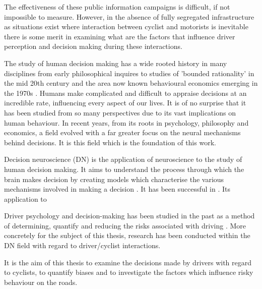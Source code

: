 The effectiveness of these public information campaigns is difficult, if not impossible to measure. However, in the absence of fully segregated infrastructure as situations exist where interaction between cyclist and motorists is inevitable there is some merit in examining what are the factors that influence driver perception and decision making during these interactions.

The study of human decision making has a wide rooted history in many disciplines from early philosophical inquires to studies of 'bounded rationality' in the mid 20th century and the area now known behavioural economics emerging in the 1970s \citep{jonesBOUNDEDRATIONALITY1999,kaoBehaviouralEconomicsClassical2015}. Humans make complicated and difficult to appraise decisions at an incredible rate, influencing every aspect of our lives. It is of no surprise that it has been studied from so many perspectives due to its vast implications on human behaviour. In recent years, from its roots in psychology, philosophy and economics, a field evolved with a far greater focus on the neural mechanisms behind decisions. It is this field which is the foundation of this work.

Decision neuroscience (DN) is the application of neuroscience to the study of human decision making. It aims to understand the process through which the brain makes decision by creating models which characterise the various mechanisms involved in making a decision \citep{}. It has been successful in . Its application to 

Driver psychology and decision-making has been studied in the past as a method of determining, quantify and reducing the risks associated with driving \cite{}. More concretely for the subject of this thesis, research has been conducted within the DN field with regard to driver/cyclist interactions. 

It is the aim of this thesis to examine the decisions made by drivers with regard to cyclists, to quantify biases and to investigate the factors which influence risky behaviour on the roads.

